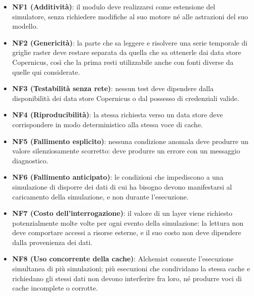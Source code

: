 \begin{itemize}
    \item \textbf{NF1 (Additività)}: \label{req:NF1} il modulo deve realizzarsi come
    estensione del simulatore, senza richiedere modifiche al suo motore né alle astrazioni
    del suo modello.

    \item \textbf{NF2 (Genericità)}: \label{req:NF2} la parte che sa leggere e risolvere una
    serie temporale di griglie raster deve restare separata da quella che sa ottenerle dai
    data store Copernicus, così che la prima resti utilizzabile anche con fonti diverse da
    quelle qui considerate.

    \item \textbf{NF3 (Testabilità senza rete)}: \label{req:NF3} nessun test deve dipendere
    dalla disponibilità dei data store Copernicus o dal possesso di credenziali valide.

    \item \textbf{NF4 (Riproducibilità)}: \label{req:NF4} la stessa richiesta verso un data
    store deve corrispondere in modo deterministico alla stessa voce di cache.

    \item \textbf{NF5 (Fallimento esplicito)}: \label{req:NF5} nessuna condizione anomala
    deve produrre un valore silenziosamente scorretto: deve produrre un errore con un
    messaggio diagnostico.

    \item \textbf{NF6 (Fallimento anticipato)}: \label{req:NF6} le condizioni che
    impediscono a una simulazione di disporre dei dati di cui ha bisogno devono
    manifestarsi al caricamento della simulazione, e non durante l'esecuzione.

    \item \textbf{NF7 (Costo dell'interrogazione)}: \label{req:NF7} il valore di un layer
    viene richiesto potenzialmente molte volte per ogni evento della simulazione: la lettura
    non deve comportare accessi a risorse esterne, e il suo costo non deve dipendere dalla
    provenienza dei dati.

    \item \textbf{NF8 (Uso concorrente della cache)}: \label{req:NF8} Alchemist consente
    l'esecuzione simultanea di più simulazioni; più esecuzioni che condividano la stessa
    cache e richiedano gli stessi dati non devono interferire fra loro, né produrre voci di
    cache incomplete o corrotte.
\end{itemize}

